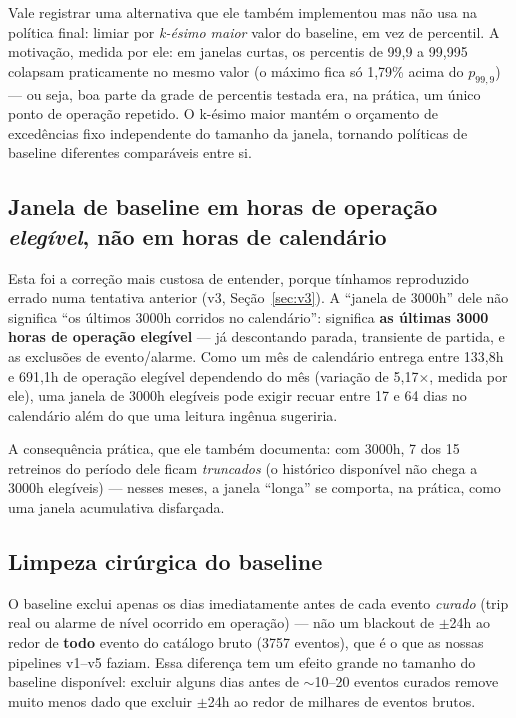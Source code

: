 \documentclass[11pt,a4paper]{article}
\begin{document}
Vale registrar uma alternativa que ele também implementou mas não usa na
política final: limiar por \emph{k-ésimo maior} valor do baseline, em
vez de percentil. A motivação, medida por ele: em janelas curtas, os
percentis de 99,9 a 99,995 colapsam praticamente no mesmo valor (o
máximo fica só 1,79\% acima do $p_{99{,}9}$) --- ou seja, boa parte da
grade de percentis testada era, na prática, um único ponto de operação
repetido. O k-ésimo maior mantém o orçamento de excedências fixo
independente do tamanho da janela, tornando políticas de baseline
diferentes comparáveis entre si.

\subsection{Janela de baseline em horas de operação \emph{elegível},
não em horas de calendário}
\label{sec:baseline-window}

Esta foi a correção mais custosa de entender, porque tínhamos
reproduzido errado numa tentativa anterior (v3, Seção~\ref{sec:v3}). A
``janela de 3000h'' dele não significa ``os últimos 3000h corridos no
calendário'': significa \textbf{as últimas 3000 horas de operação
elegível} --- já descontando parada, transiente de partida, e as
exclusões de evento/alarme. Como um mês de calendário entrega entre
133,8h e 691,1h de operação elegível dependendo do mês (variação de
5,17$\times$, medida por ele), uma janela de 3000h elegíveis pode exigir
recuar entre 17 e 64 dias no calendário além do que uma leitura ingênua
sugeriria.

A consequência prática, que ele também documenta: com 3000h, 7 dos 15
retreinos do período dele ficam \emph{truncados} (o histórico disponível
não chega a 3000h elegíveis) --- nesses meses, a janela ``longa'' se
comporta, na prática, como uma janela acumulativa disfarçada.

\subsection{Limpeza cirúrgica do baseline}

O baseline exclui apenas os dias imediatamente antes de cada evento
\emph{curado} (trip real ou alarme de nível ocorrido em operação) --- não
um blackout de $\pm$24h ao redor de \textbf{todo} evento do catálogo
bruto (3757 eventos), que é o que as nossas pipelines v1--v5 faziam. Essa
diferença tem um efeito grande no tamanho do baseline disponível: excluir
alguns dias antes de $\sim$10--20 eventos curados remove muito menos dado
que excluir $\pm$24h ao redor de milhares de eventos brutos.
\end{document}
